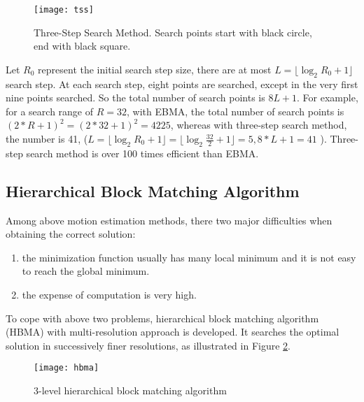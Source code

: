 \documentclass[a4paper, twocolumn]{article}
\begin{document}
	\begin{figure}[h]
	\centering
	\texttt{[image: tss]}
	\caption{Three-Step Search Method. Search points start with black circle, end with black square.}
	\label{fig:tss}
	\end{figure}
	
	\noindent
	Let $ R_{0} $ represent the initial search step size, there are at most $ L = \lfloor   \log_{2}{R_{0} + 1} \rfloor $ search step. At each search step, eight points are searched, except in the very first nine points searched. So the total number of search points is $ 8L + 1 $. For example, for a search range of $ R = 32 $, with EBMA, the total number of search points is $ (2*R+1)^2 = (2*32+1)^2 = 4225 $, whereas with three-step search method, the number is 41, ($ L = \lfloor   \log_{2}{R_{0} + 1} \rfloor = \lfloor   \log_{2}{\frac{32}{2} + 1} \rfloor = 5, 8*L+1 = 41$ ). Three-step search method is over 100 times efficient than EBMA.
	
	\subsection{Hierarchical Block Matching Algorithm}
	Among above motion estimation methods, there two major difficulties when obtaining the correct solution:
	\begin{enumerate}
		\item the minimization function usually has many local minimum and it is not easy to reach the global minimum.
		\item the expense of computation is very high.
	\end{enumerate}
	To cope with above two problems, hierarchical block matching algorithm (HBMA) with multi-resolution approach is developed. It searches the optimal solution in successively finer resolutions, as illustrated in Figure \ref{fig:hbma}.
	
	\begin{figure}[h]
	\centering
	\texttt{[image: hbma]}
	\caption{3-level hierarchical block matching algorithm}
	\label{fig:hbma}
	\end{figure}
\end{document}
